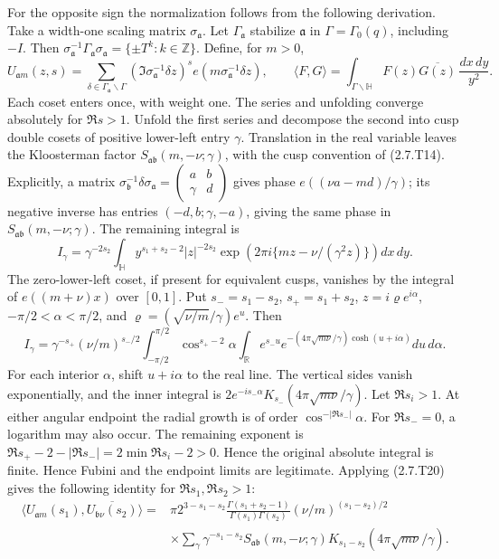 For the opposite sign the normalization follows from the following derivation. Take a width-one scaling matrix $\sigma_{\mathfrak a}$. Let $\Gamma_{\mathfrak a}$ stabilize $\mathfrak a$ in $\Gamma=\Gamma_0(q)$, including $-I$. Then
$\sigma_{\mathfrak a}^{-1}\Gamma_{\mathfrak a}\sigma_{\mathfrak a}
=\{\pm T^k:k\in\mathbb Z\}$. Define, for $m>0$,
\[
 U_{\mathfrak a m}(z,s)=
 \sum_{\delta\in\Gamma_{\mathfrak a}\backslash\Gamma}
 (\Im\sigma_{\mathfrak a}^{-1}\delta z)^s
 e(m\sigma_{\mathfrak a}^{-1}\delta z),\qquad
 \langle F,G\rangle=\int_{\Gamma\backslash\mathbb H}
 F(z)\overline{G(z)}\,\frac{dx\,dy}{y^2}.
\]
Each coset enters once, with weight one. The series and
unfolding converge absolutely for $\Re s>1$.
Unfold the first series and decompose the second into cusp double
cosets of positive lower-left entry $\gamma$. Translation in the
real variable leaves the Kloosterman factor
$S_{\mathfrak a\mathfrak b}(m,-\nu;\gamma)$, with the
cusp convention of (2.7.T14). Explicitly, a matrix
$\sigma_{\mathfrak b}^{-1}\delta\sigma_{\mathfrak a}
=(\begin{smallmatrix}a&b\\\gamma&d\end{smallmatrix})$
gives phase $e((\nu a-md)/\gamma)$; its negative inverse
has entries $(-d,b;\gamma,-a)$, giving the same phase in
$S_{\mathfrak a\mathfrak b}(m,-\nu;\gamma)$.
The remaining integral is
\[
 I_\gamma=\gamma^{-2s_2}\int_{\mathbb H}
 y^{s_1+s_2-2}|z|^{-2s_2}
 \exp\!\left(2\pi i\{mz-\nu/(\gamma^2z)\}\right)dx\,dy.
\]
The zero-lower-left coset, if present for equivalent cusps,
vanishes by the integral of $e((m+\nu)x)$ over $[0,1]$.
Put $s_-=s_1-s_2$, $s_+=s_1+s_2$,
$z=i\varrho e^{i\alpha}$, $-\pi/2<\alpha<\pi/2$, and
$\varrho=(\sqrt{\nu/m}/\gamma)e^u$. Then
\[
 I_\gamma=\gamma^{-s_+}(\nu/m)^{s_-/2}
 \int_{-\pi/2}^{\pi/2}\cos^{s_+-2}\alpha
 \int_{\mathbb R}e^{s_-u}
 e^{-(4\pi\sqrt{m\nu}/\gamma)\cosh(u+i\alpha)}du\,d\alpha.
\]
For each interior $\alpha$, shift $u+i\alpha$ to the real
line. The vertical sides vanish exponentially, and the inner integral
is $2e^{-is_-\alpha}K_{s_-}(4\pi\sqrt{m\nu}/\gamma)$.
Let $\Re s_i>1$. At either angular endpoint the radial growth is of order $\cos^{- |\Re s_-|}\alpha$. For $\Re s_-=0$, a logarithm may also occur. The remaining exponent is $\Re s_+-2-|\Re s_-|=2\min\Re s_i-2>0$. Hence the original absolute integral is finite.
Hence Fubini and the endpoint limits are legitimate. Applying (2.7.T20) gives the following identity for $\Re s_1,\Re s_2>1$:
\[
\begin{aligned}
\langle U_{\mathfrak a m}(s_1),
             \overline{U_{\mathfrak b\nu}(s_2)}\rangle
={}&\pi2^{3-s_1-s_2}
 \frac{\Gamma(s_1+s_2-1)}{\Gamma(s_1)\Gamma(s_2)}
 (\nu/m)^{(s_1-s_2)/2}\\
&\times\sum_\gamma\gamma^{-s_1-s_2}
 S_{\mathfrak a\mathfrak b}(m,-\nu;\gamma)
 K_{s_1-s_2}(4\pi\sqrt{m\nu}/\gamma).
\end{aligned}
\tag{2.7.T19}\label{p1:eq:2.7.T19}
\]
